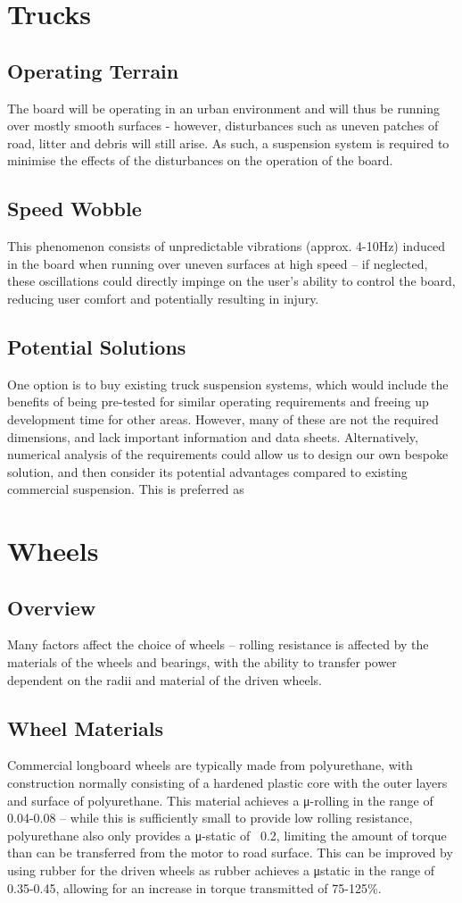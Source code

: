\documentclass[journal,10pt]{IEEEtran}
\begin{document}
\section{Trucks}
    \subsection{Operating Terrain}
    The board will be operating in an urban environment and will thus be running over mostly smooth surfaces - however, disturbances such as uneven patches of road, litter and debris will still arise. As such, a suspension system is required to minimise the effects of the disturbances on the operation of the board.
    \subsection{Speed Wobble}
    This phenomenon consists of unpredictable vibrations (approx. 4-10Hz) induced in the board when running over uneven surfaces at high speed – if neglected, these oscillations could directly impinge on the user’s ability to control the board, reducing user comfort and potentially resulting in injury. 
    \subsection{Potential Solutions}
    One option is to buy existing truck suspension systems, which would include the benefits of being pre-tested for similar operating requirements and freeing up development time for other areas. However, many of these are not the required dimensions, and lack important information and data sheets. Alternatively, numerical analysis of the requirements could allow us to design our own bespoke solution, and then consider its potential advantages compared to existing commercial suspension. This is preferred as
\section{Wheels}
    \subsection{Overview}
    Many factors affect the choice of wheels – rolling resistance is affected by the materials of the wheels and bearings, with the ability to transfer power dependent on the radii and material of the driven wheels.
    \subsection{Wheel Materials}
    Commercial longboard wheels are typically made from polyurethane, with construction normally consisting of a hardened plastic core with the outer layers and surface of polyurethane. This material achieves a μ-rolling in the range of 0.04-0.08 – while this is sufficiently small to provide low rolling resistance, polyurethane also only provides a μ-static of ~0.2, limiting the amount of torque than can be transferred from the motor to road surface. This can be improved by using rubber for the driven wheels as rubber achieves a μstatic in the range of 0.35-0.45, allowing for an increase in torque transmitted of 75-125\%.
\end{document}
